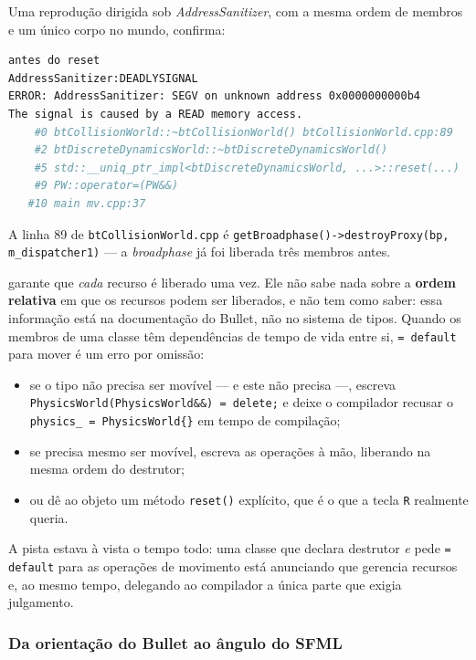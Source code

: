 Uma reprodução dirigida sob \emph{AddressSanitizer}, com a mesma ordem de
membros e um único corpo no mundo, confirma:

\begin{lstlisting}[style=bt, language=bash,
    caption={\texttt{g++ -fsanitize=address}; a linha 37 é o \texttt{p = PW\{\}}.}]
antes do reset
AddressSanitizer:DEADLYSIGNAL
ERROR: AddressSanitizer: SEGV on unknown address 0x0000000000b4
The signal is caused by a READ memory access.
    #0 btCollisionWorld::~btCollisionWorld() btCollisionWorld.cpp:89
    #2 btDiscreteDynamicsWorld::~btDiscreteDynamicsWorld()
    #5 std::__uniq_ptr_impl<btDiscreteDynamicsWorld, ...>::reset(...)
    #9 PW::operator=(PW&&)
   #10 main mv.cpp:37
\end{lstlisting}

A linha 89 de \texttt{btCollisionWorld.cpp} é
\texttt{getBroadphase()->destroyProxy(bp, m\_dispatcher1)} --- a
\emph{broadphase} já foi liberada três membros antes.

\begin{armadilha}[\texttt{= default} num tipo com dependências entre membros]
 garante que \emph{cada} recurso é liberado uma vez.
Ele não sabe nada sobre a \textbf{ordem relativa} em que os recursos podem ser
liberados, e não tem como saber: essa informação está na documentação do Bullet,
não no sistema de tipos. Quando os membros de uma classe têm dependências de
tempo de vida entre si, \texttt{= default} para mover é um erro por omissão:
\begin{itemize}
  \item se o tipo não precisa ser movível --- e este não precisa ---, escreva
        \texttt{PhysicsWorld(PhysicsWorld\&\&) = delete;} e deixe o compilador
        recusar o \texttt{physics\_ = PhysicsWorld\{\}} em tempo de compilação;
  \item se precisa mesmo ser movível, escreva as operações à mão, liberando na
        mesma ordem do destrutor;
  \item ou dê ao objeto um método \texttt{reset()} explícito, que é o que a
        tecla \texttt{R} realmente queria.
\end{itemize}
A pista estava à vista o tempo todo: uma classe que declara destrutor
\emph{e} pede \texttt{= default} para as operações de movimento está anunciando
que gerencia recursos e, ao mesmo tempo, delegando ao compilador a única parte
que exigia julgamento.
\end{armadilha}

\subsubsection{Da orientação do Bullet ao ângulo do SFML}

